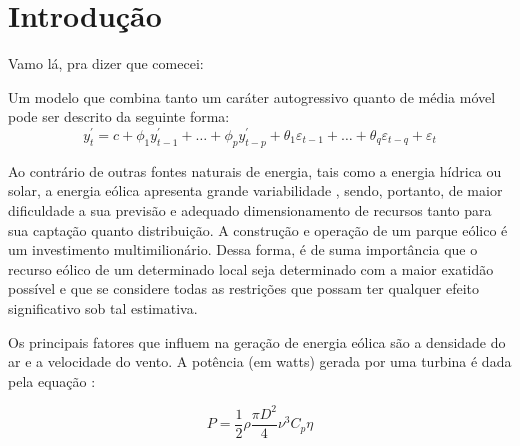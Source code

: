 \documentclass[
	12pt,				%
	openright,			%
	oneside,			%
	a4paper,			%
	english,			%
	french,				%
	spanish,			%
	brazil				%
	]{abntex2}
\begin{document}
\tableofcontents*



\textual

\chapter*[Introdução]{Introdução}

Vamo lá, pra dizer que comecei:

Um modelo que combina tanto um caráter autogressivo quanto de média móvel pode ser descrito da seguinte forma:
$$ y^{'}_{t} = c + \phi_{1}y^{'}_{t-1} + \dots + \phi_{p}y^{'}_{t-p} + \theta_{1}\varepsilon_{t-1} + \dots + \theta_{q}\varepsilon_{t-q} + \varepsilon_{t}$$


Ao contrário de outras fontes naturais de energia, tais como a energia hídrica ou solar, a energia eólica apresenta grande variabilidade \cite{thomas}, sendo, portanto, de maior dificuldade a sua previsão e
adequado dimensionamento de recursos tanto para sua captação quanto distribuição. A construção e operação de um parque eólico é um investimento multimilionário. Dessa forma, é de suma 
importância que o recurso eólico de um determinado local seja determinado com a maior exatidão possível e que se considere todas as restrições que possam ter qualquer efeito significativo sob tal estimativa.


Os principais fatores que influem na geração de energia eólica são a densidade do ar e a velocidade do vento. A potência (em watts) gerada por uma turbina é dada pela equação \cite{atlas}:

\begin{equation}
	P = \frac{1}{2}\rho \frac{\pi D^2}{4}\nu^3C_p\eta
\end{equation}
\end{document}

